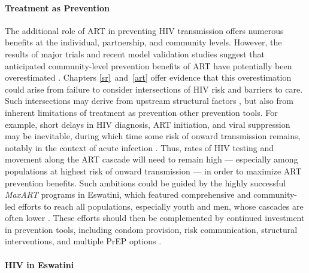 \paragraph{Treatment as Prevention}
The additional role of ART in preventing HIV transmission offers numerous benefits
at the individual, partnership, and community levels.
However, the results of major trials and recent model validation studies suggest that
anticipated community-level prevention benefits of ART have potentially been overestimated
\cite{Eaton2015,Baral2019,Havlir2020}.
Chapters \ref{sr}~and~\ref{art} offer evidence that this overestimation could arise from
failure to consider intersections of HIV risk and barriers to care.
Such intersections may derive from upstream structural factors
\cite{Beyrer2012,Baral2013,Shannon2015,McBride2021},
but also from inherent limitations of treatment as prevention \vs other prevention tools.
For example, short delays in HIV diagnosis, ART initiation, and viral suppression may be inevitable,
during which time some risk of onward transmission remains,
notably in the context of acute infection \cite{Cohen2012}.
Thus, rates of HIV testing and movement along the ART cascade will need to remain high
--- especially among populations at highest risk of onward transmission ---
in order to maximize ART prevention benefits.
Such ambitions could be guided by the highly successful \emph{MaxART} programs in Eswatini,
which featured comprehensive and community-led efforts to reach all populations,
especially youth and men, whose cascades are often lower \cite{MaxART1,MaxART2,Green2020}.
These efforts should then be complemented by continued investment in prevention tools,
including condom provision, risk communication, structural interventions, and multiple PrEP options
\cite{Eisinger2019tk}.
\paragraph{HIV in Eswatini}
